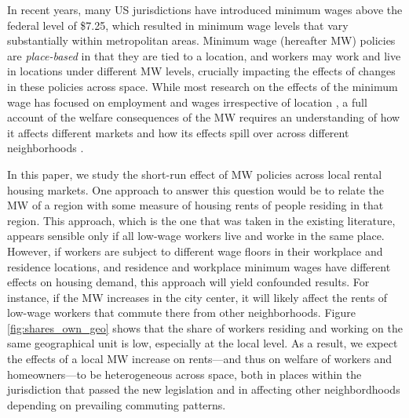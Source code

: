 

In recent years, many US jurisdictions have introduced minimum wages above the 
federal level of \$7.25, which resulted in minimum wage levels that vary 
substantially within metropolitan areas.
Minimum wage (hereafter MW) policies are \textit{place-based} in that they are 
tied to a location, and workers may work and live in locations under different 
MW levels, crucially impacting the effects of changes in these policies across 
space.
While most research on the effects of the minimum wage has focused on employment 
and wages irrespective of location 
\parencite[e.g.,][]{CardKrueger1994, AutorEtAl2016, CegnizEtAl2019}, 
a full account of the welfare consequences of the MW requires an understanding of 
how it affects different markets and how its effects spill over across different 
neighborhoods \parencite[as recently emphasized by][]{DubeLindner2021}.

In this paper, we study the short-run effect of MW policies across local rental 
housing markets.
One approach to answer this question would be to relate the MW of a region with 
some measure of housing rents of people residing in that region.
This approach, which is the one that was taken in the existing literature, appears 
sensible only if all low-wage workers live and worke in the same place.
However, if workers are subject to different wage floors in their workplace and
residence locations, and residence and workplace minimum wages have different 
effects on housing demand, this approach will yield confounded results.
For instance, if the MW increases in the city center, it will likely affect the 
rents of low-wage workers that commute there from other neighborhoods.
Figure \ref{fig:shares_own_geo} shows that the share of workers residing and 
working on the same geographical unit is low, especially at the local level.
As a result, we expect the effects of a local MW increase on rents---and thus on 
welfare of workers and homeowners---to be heterogeneous across space, both in 
places within the jurisdiction that passed the new legislation and in affecting
other neighbordhoods depending on prevailing commuting patterns.

